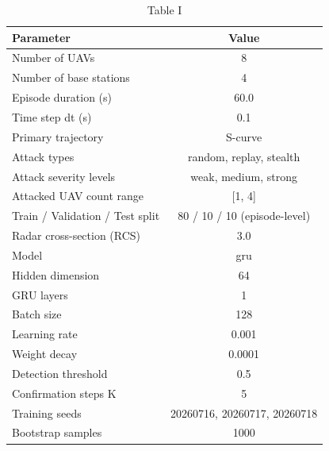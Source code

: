 \begin{table}[htbp]
  \centering
  \caption{Table I}
  \label{tab:table01_simulation_setup}
  \begin{tabular}{lc}
    \toprule
    Parameter & Value \\
    \midrule
    Number of UAVs & 8 \\
    Number of base stations & 4 \\
    Episode duration (s) & 60.0 \\
    Time step dt (s) & 0.1 \\
    Primary trajectory & S-curve \\
    Attack types & random, replay, stealth \\
    Attack severity levels & weak, medium, strong \\
    Attacked UAV count range & [1, 4] \\
    Train / Validation / Test split & 80 / 10 / 10 (episode-level) \\
    Radar cross-section (RCS) & 3.0 \\
    Model & gru \\
    Hidden dimension & 64 \\
    GRU layers & 1 \\
    Batch size & 128 \\
    Learning rate & 0.001 \\
    Weight decay & 0.0001 \\
    Detection threshold & 0.5 \\
    Confirmation steps K & 5 \\
    Training seeds & 20260716, 20260717, 20260718 \\
    Bootstrap samples & 1000 \\
    \bottomrule
  \end{tabular}
\end{table}
